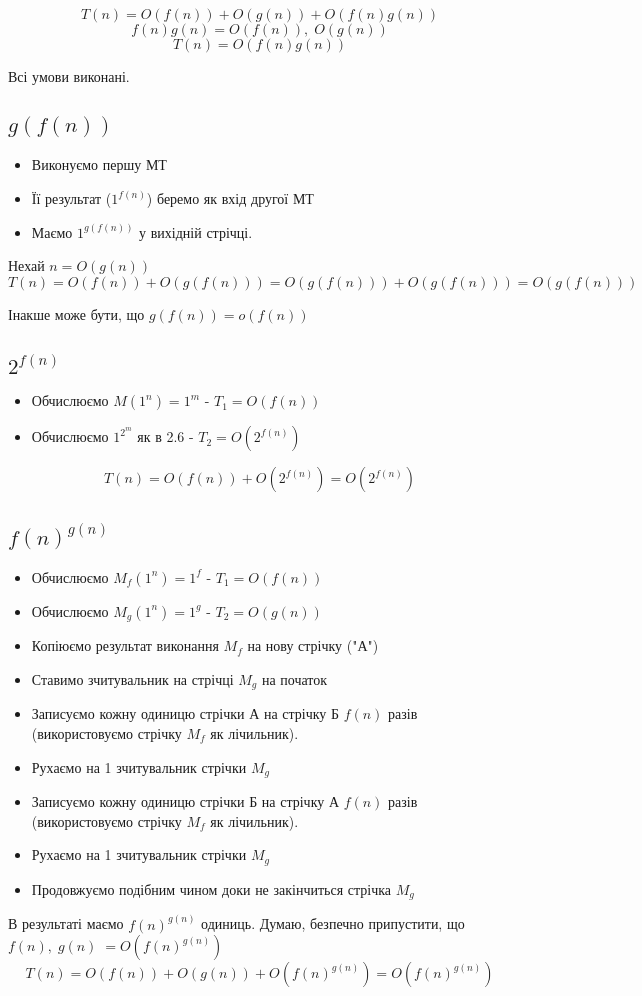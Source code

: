 \documentclass[11pt, a4paper]{article} %
\begin{document}
$$
T(n) = O(f(n)) + O(g(n)) + O(f(n)g(n))
$$
$$ f(n)g(n) = O(f(n)),\; O(g(n)) $$
$$ T(n) = O(f(n)g(n)) $$

Всі умови виконані. \; \qedsymbol

\subsection*{$g(f(n))$}

\begin{itemize}
    \item Виконуємо першу МТ
    \item Її результат ($1^{f(n)}$) беремо як вхід другої МТ
    \item Маємо $1^{g(f(n))}$ у вихідній стрічці.
\end{itemize}

Нехай $n = O(g(n))$
$$T(n) = O(f(n)) + O(g(f(n))) = O(g(f(n))) + O(g(f(n))) = O(g(f(n)))$$

Інакше може бути, що $g(f(n)) = o(f(n))$ \; \qedhere

\subsection*{$2^{f(n)}$}
\begin{itemize}
    \item Обчислюємо $M(1^n) = 1^m$ - $T_1 = O(f(n))$
    \item Обчислюємо $1^{2^m}$ як в 2.6 - $T_2 = O(2^{f(n)})$
\end{itemize}

$$
T(n) = O(f(n)) + O(2^{f(n)}) = O(2^{f(n)})
$$
\qedhere

\subsection*{$f(n)^{g(n)}$}
\begin{itemize}
    \item Обчислюємо $M_f(1^n) = 1^f$ - $T_1 = O(f(n))$
    \item Обчислюємо $M_g(1^n) = 1^g$ - $T_2 = O(g(n))$
    \item Копіюємо результат виконання $M_f$ на нову стрічку ("А")
    \item Ставимо зчитувальник на стрічці $M_g$ на початок
    \item Записуємо кожну одиницю стрічки А на стрічку Б $f(n)$ разів (використовуємо стрічку $M_f$ як лічильник).
    \item Рухаємо на 1 зчитувальник стрічки $M_g$
    \item Записуємо кожну одиницю стрічки Б на стрічку А $f(n)$ разів (використовуємо стрічку $M_f$ як лічильник).
    \item Рухаємо на 1 зчитувальник стрічки $M_g$
    \item Продовжуємо подібним чином доки не закінчиться стрічка $M_g$
\end{itemize}
В результаті маємо $f(n)^{g(n)}$ одиниць.
Думаю, безпечно припустити, що $f(n),\; g(n) \; = O(f(n)^{g(n)})$
$$
T(n) = O(f(n)) + O(g(n)) + O(f(n)^{g(n)}) = O(f(n)^{g(n)})
$$
\qedsymbol
\end{document}
